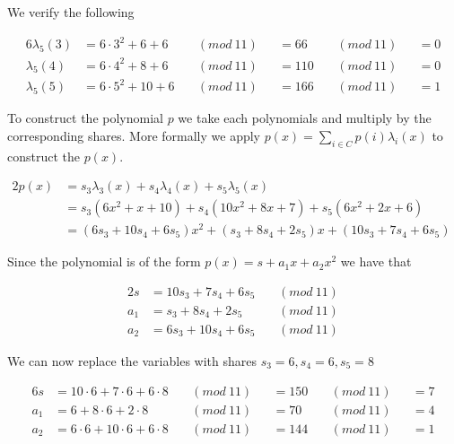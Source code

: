 \noindent
We verify the following

\noindent
\begin{alignat*}{6}
\lambda_5(3) &=  6 \cdot 3^2+6+ 6  \ &&(mod \ 11) &&= 66 \ &&(mod \ 11)  &&= 0 \\
\lambda_5(4) &=  6 \cdot 4^2+8+ 6  \ &&(mod \ 11) &&= 110 \ &&(mod \ 11) &&= 0 \\
\lambda_5(5) &=  6 \cdot 5^2+10+6  \ &&(mod \ 11) &&= 166 \ &&(mod \ 11) &&= 1  
\end{alignat*}




\noindent
To construct the polynomial \begin{math}p\end{math} we take each polynomials and multiply by the corresponding shares. More formally we apply \begin{math}p(x)=\sum\limits_{i \in C} p(i)\lambda_i(x)\end{math} to construct the $p(x)$.



\noindent
 \begin{alignat*}{2}
p(x) &= s_3 \lambda_3 (x) + s_4 \lambda_4 (x) + s_5 \lambda_5 (x) &\\
     &= s_3(6x^2+x+ 10) + s_4(10x^2 + 8x + 7)  + s_5(6x^2 + 2x + 6)&\\
     &= (6s_3+10s_4+6s_5)x^2 + (s_3 + 8s_4 + 2s_5)x  + (10s_3 + 7s_4 + 6s_5)&
\end{alignat*} 
   

\noindent
Since the polynomial is of the form $p(x)=s + a_{1}x+ a_{2}x^2$ we have that

\noindent
\begin{alignat*}{2}
s&  = 10s_3 + 7s_4 + 6s_5 \ &&(mod \ 11)  \\
a_1&= s_3 + 8s_4 + 2s_5\ &&(mod \ 11) \\
a_2&= 6s_3+10s_4+6s_5\ &&(mod \ 11) 
\end{alignat*} 

\noindent
We can now replace the variables with shares $s_3=6, s_4=6, s_5=8$

\noindent
\begin{alignat*}{6}
s&  = 10 \cdot 6 + 7 \cdot 6 + 6 \cdot 8 \ &&(mod \ 11)  &&= 150  \ &&(mod \ 11) &&= 7\\
a_1&= 6 + 8 \cdot 6 + 2 \cdot 8 \ &&(mod \ 11) &&= 70  \ &&(mod \ 11) &&= 4\\
a_2&= 6 \cdot 6 +10 \cdot 6+ 6 \cdot 8 \ &&(mod \ 11) &&= 144  \ &&(mod \ 11) &&= 1
\end{alignat*}

